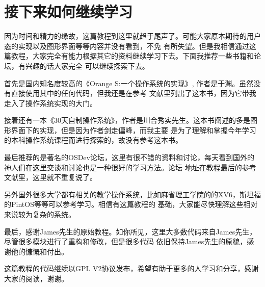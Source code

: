 
\section {接下来如何继续学习}

\par 因为时间和精力的缘故，这篇教程到这里就趋于尾声了。可能大家原本期待的用户态的实现以及图形界面等等内容并没有看到，不免\allowbreak
有所失望。但是我相信通过这篇教程，大家完全有能力根据其它的资料继续学习下去。下面我推荐一些书籍和论坛，有兴趣的话大家完全\allowbreak
可以继续探索下去。

\par 首先是国内知名度较高的《Orange S:一个操作系统的实现》, 作者是于渊。虽然没有直接使用其中的任何代码，但我还是在参考\allowbreak
文献里列出了这本书，因为它带我走入了操作系统实现的大门。

\par 接着还有一本《30天自制操作系统》，作者是川合秀实先生。这本书阐述的多是图形界面下的实现，但是因为作者剑走偏峰，而我主要\allowbreak
是为了理解和掌握今年学习的本科操作系统课程而进行探索的，故没有参考这本书。

\par 最后推荐的是著名的OSDev论坛，这里有很不错的资料和讨论，每天看到国外的神人们在这里交谈和讨论也是一种很好的学习方法。论坛\allowbreak
地址在教程最后的参考文献里，这里就不重复说了。

\par 另外国外很多大学都有相关的教学操作系统，比如麻省理工学院的的XV6，斯坦福的PintOS等等可以参考学习。相信有这篇教程的\allowbreak
基础，大家能尽快理解这些相对来说较为复杂的系统。

\par 最后，感谢James先生的原始教程。如你所见，这里大多数代码来自James先生，尽管很多模块进行了重构和修改，但是很多代码\allowbreak
依旧保持James先生的原貌，感谢他的慷慨和付出。

\par 这篇教程的代码继续以GPL V2协议发布，希望有助于更多的人学习和分享，感谢大家的阅读，谢谢。


